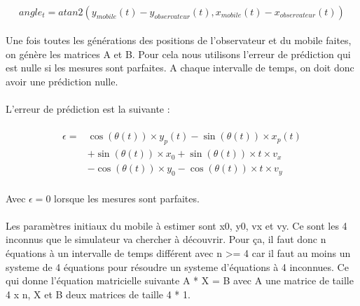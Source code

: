 \documentclass[a4paper,11pt]{article}
\begin{document}
		\paragraph{}
			\begin{equation} 
				angle_{t} = atan2( y_{mobile}(t) -  y_{observateur}(t) , x_{mobile}(t) -  x_{observateur}(t) )
			\end{equation}

		\paragraph{}
		Une fois toutes les générations des positions de l'observateur et du mobile faites, on génère les matrices A et B.
		Pour cela nous utilisons l'erreur de prédiction qui est nulle si les mesures sont parfaites. A chaque intervalle de temps, on doit donc avoir une prédiction nulle.

		\paragraph{}
		L’erreur de prédiction est la suivante :

		\paragraph{}
		\begin{equation}
		   \begin{split}
		      \epsilon=&\cos(\theta(t)) \times y_p(t) -\sin(\theta(t)) \times x_p(t)\\
		        &+\sin(\theta(t)) \times x_0 +\sin(\theta(t)) \times t \times v_x\\
		        &-\cos(\theta(t)) \times y_0 -\cos(\theta(t)) \times t \times v_y
		   \end{split}
		\end{equation}

		\paragraph{}
		Avec $\epsilon=0$ lorsque les mesures sont parfaites.

		\paragraph{}
		Les paramètres initiaux du mobile à estimer sont x0, y0, vx et vy. Ce sont les 4 inconnus que le simulateur va chercher à découvrir. Pour ça, il faut donc n équations à un intervalle de temps différent avec n >= 4 car il faut au moins un systeme de 4 équations pour résoudre un systeme d'équations à 4 inconnues.
		Ce qui donne l'équation matricielle suivante
		A * X = B avec A une matrice de taille 4 x n, X et B deux matrices de taille 4 * 1. 
\end{document}
